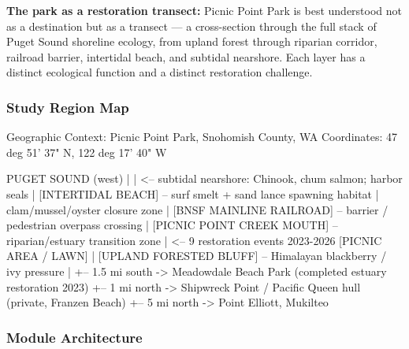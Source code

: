 \documentclass[11pt,letterpaper]{article}
\begin{document}
\textbf{The park as a restoration transect:} Picnic Point Park is best understood not as a destination but as a transect --- a cross-section through the full stack of Puget Sound shoreline ecology, from upland forest through riparian corridor, railroad barrier, intertidal beach, and subtidal nearshore. Each layer has a distinct ecological function and a distinct restoration challenge.

\subsubsection{Study Region Map}

\begin{asciibox}
Geographic Context: Picnic Point Park, Snohomish County, WA
Coordinates: 47 deg 51' 37" N, 122 deg 17' 40" W

PUGET SOUND (west)
     |
     |  <-- subtidal nearshore: Chinook, chum salmon; harbor seals
     |
[INTERTIDAL BEACH] -- surf smelt + sand lance spawning habitat
     |                 clam/mussel/oyster closure zone
     |
[BNSF MAINLINE RAILROAD] -- barrier / pedestrian overpass crossing
     |
[PICNIC POINT CREEK MOUTH] -- riparian/estuary transition zone
     |                        <-- 9 restoration events 2023-2026
[PICNIC AREA / LAWN]
     |
[UPLAND FORESTED BLUFF] -- Himalayan blackberry / ivy pressure
     |
     +-- 1.5 mi south -> Meadowdale Beach Park (completed estuary restoration 2023)
     +-- 1 mi north  -> Shipwreck Point / Pacific Queen hull (private, Franzen Beach)
     +-- 5 mi north  -> Point Elliott, Mukilteo
\end{asciibox}

\subsubsection{Module Architecture}
\end{document}
